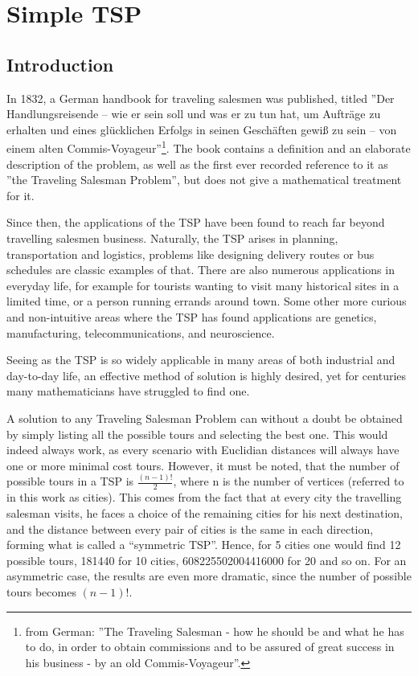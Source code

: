 \chapter{Simple TSP}

\section{Introduction}

\par
In 1832, a German handbook for traveling salesmen was published, titled ''Der Handlungsreisende – wie er sein soll und was er zu tun hat, um Aufträge zu erhalten und eines glücklichen Erfolgs in seinen Geschäften gewiß zu sein – von einem alten Commis-Voyageur''\footnote{%
	from German: ''The Traveling Salesman - how he should be and what he has to do, in order to obtain commissions and to be assured of great success in his business - by an old Commis-Voyageur''.}. 
 The book contains a definition and an elaborate description of the problem, as well as the first ever recorded reference to it as ''the Traveling Salesman Problem'', but does not give a mathematical treatment for it. 
 
\vspace{5mm}
Since then, the applications of the TSP have been found to reach far beyond travelling salesmen business. Naturally, the TSP arises in planning, transportation and logistics, problems like designing delivery routes or bus schedules are classic examples of that. There are also numerous applications in everyday life, for example for tourists wanting to visit many historical sites in a limited time, or a person running errands around town. Some other more curious and non-intuitive areas where the TSP has found applications are genetics, manufacturing, telecommunications, and neuroscience.

\vspace{5mm}
Seeing as the TSP is so widely applicable in many areas of both industrial and day-to-day life, an effective method of solution is highly desired, yet for centuries many mathematicians have struggled to find one.

\vspace{5mm}
A solution to any Traveling Salesman Problem can without a doubt be obtained by simply listing all the possible tours and selecting the best one. This would indeed always work, as every scenario with Euclidian distances will always have one or more minimal cost tours. However, it must be noted, that the number of possible tours in a TSP is $\frac{(n-1)!}{2}$, where n is the number of vertices (referred to in this work as cities). This comes from the fact that at every city the travelling salesman visits, he faces a choice of the remaining cities for his next destination, and the distance between every pair of cities is the same in each direction, forming what is called a “symmetric TSP”. Hence, for 5 cities one would find 12 possible tours, 181440 for 10 cities, 608225502004416000 for 20 and so on. For an asymmetric case, the results are even more dramatic, since the number of possible tours becomes $(n-1)!$.

